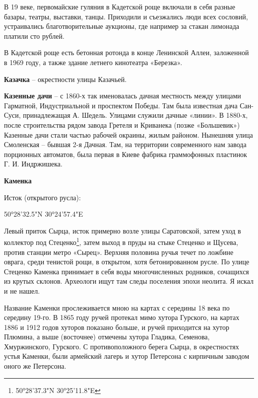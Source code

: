 
В 19 веке, первомайские гуляния в Кадетской роще включали в себя разные базары, театры, выставки, танцы. Приходили и съезжались люди всех сословий, устраивались благотворительные аукционы, где например за стакан лимонада платили сто рублей.

В Кадетской роще есть бетонная ротонда в конце Ленинской Аллеи, заложенной в 1969 году, а также здание летнего кинотеатра «Березка».\\


\medskip

\textbf{Казачка} – окрестности улицы Казачьей.\\


\medskip

\textbf{Казенные дачи} – с 1860-х так именовалась дачная местность между улицами Гарматной, Индустриальной и проспектом Победы. Там была известная дача Сан-Суси, принадлежащая А. Шедель. Улицами служили дачные «линии». В 1880-х, после строительства рядом завода Гретеля и Криванека (позже «Большевик») Казенные дачи стали частью рабочей окраины, жилым районом. Нынешняя улица Смоленская – бывшая 2-я Дачная. Там, на территории современного нам завода порционных автоматов, была первая в Киеве фабрика граммофонных пластинок Г. И. Индржишека.\\

\medskip

\textbf{Каменка}

Исток (открытого русла): 

50°28'32.5"N 30°24'57.4"E

Левый приток Сырца, исток примерно возле улицы Саратовской, затем уход в коллектор под Стеценко\footnote{50°28'37.3"N 30°25'11.8"E}, затем выход в пруды на стыке Стеценко и Щусева, против станции метро «Сырец». Верхняя половина ручья течет по ложбине оврага, среди тенистой рощи, в открытом, хотя бетонированном русле. По улице Стеценко Каменка принимает в себя воды многочисленных родников, сочащихся из крутых склонов. Археологи ищут там следы поселения эпохи неолита. Я искал и не нашел.

Название Каменки прослеживается мною на картах с середины 18 века по середину 19-го. В 1865 году ручей протекал мимо хутора Гурского, на картах 1886 и 1912 годов хуторов показано больше, и ручей приходится на хутор Плюмина, а выше (восточнее) отмечены хутора Гладика, Семенова, Хмуржинского, Гурского. С противоположного берега Сырца, в окрестностях устья Каменки, были армейский лагерь и хутор Петерсона с кирпичным заводом оного же Петерсона.


